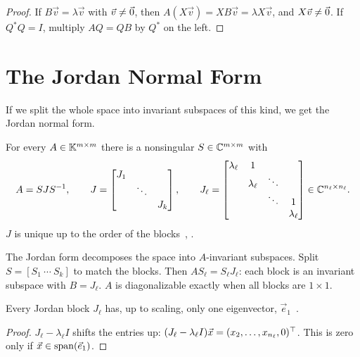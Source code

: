 \begin{proof}
  If $B\vec{v} = \lambda\vec{v}$ with $\vec{v} \ne \vec{0}$, then $A(X\vec{v}) = XB\vec{v} = \lambda X\vec{v}$, and $X\vec{v} \ne \vec{0}$. If $Q^\ast Q = I$, multiply $AQ = QB$ by $Q^\ast$ on the left.
\end{proof}

\clearpage
\section{The Jordan Normal Form}
\label{sec:jordan}

If we split the whole space into invariant subspaces of this kind, we get the Jordan normal form.

\begin{theorem}
  \label{thm:jordan}
  For every $A \in \mathbb{K}^{m \times m}$ there is a nonsingular $S \in \mathbb{C}^{m \times m}$ with
  \begin{equation}
    A = SJS^{-1}, \qquad J = \begin{bmatrix} J_1 & & \\ & \ddots & \\ & & J_k \end{bmatrix}, \qquad J_\ell = \begin{bmatrix} \lambda_\ell & 1 & & \\ & \lambda_\ell & \ddots & \\ & & \ddots & 1 \\ & & & \lambda_\ell \end{bmatrix} \in \mathbb{C}^{n_\ell \times n_\ell}.
  \end{equation}
  $J$ is unique up to the order of the blocks~\cite[Thm.~4.1]{Demmel}, \cite[8.46]{Axler}.
\end{theorem}

The Jordan form decomposes the space into $A$-invariant subspaces. Split $S = [S_1\ \cdots\ S_k]$ to match the blocks. Then $AS_\ell = S_\ell J_\ell$: each block is an invariant subspace with $B = J_\ell$. $A$ is diagonalizable exactly when all blocks are $1 \times 1$.

\begin{proposition}
  \label{prop:jordan-block}
  Every Jordan block $J_\ell$ has, up to scaling, only one eigenvector, $\vec{e}_1$~\cite[Prop.~4.2]{Demmel}.
\end{proposition}

\begin{proof}
  $J_\ell - \lambda_\ell I$ shifts the entries up: $(J_\ell - \lambda_\ell I)\vec{x} = (x_2, \dots, x_{n_\ell}, 0)^\top$. This is zero only if $\vec{x} \in \operatorname{span}(\vec{e}_1)$.
\end{proof}

